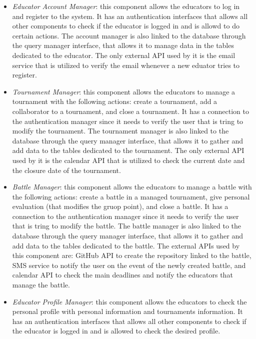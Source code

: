 \documentclass[12pt, a4paper]{report}
\begin{document}
    \begin{itemize}
        \item \textit{Educator Account Manager}: this component allows the educators to log in and register to the system.
            It has an authentication interfaces that allows all other components to check if the educator is logged in and is allowd to do certain actions. 
            The account manager is also linked to the database through the query manager interface, that allows it to manage data in the tables dedicated to the educator.
            The only external API used by it is the email service that is utilized to verify the email whenever a new eduator tries to register. 
        \item \textit{Tournament Manager}: this component allows the educators to manage a tournament with the following actions: create a tournament, add a collaborator to a tournament, and close a tournament. 
            It has a connection to the authentication manager since it needs to verify the user that is tring to modify the tournament. 
            The tournament manager is also linked to the database through the query manager interface, that allows it to gather and add data to the tables dedicated to the tournament.
            The only external API used by it is the calendar API that is utilized to check the current date and the closure date of the tournament.
        \item \textit{Battle Manager}: this component allows the educators to manage a battle with the following actions: create a battle in a managed tournament, give personal evaluation (that modifies the gruop point), and close a battle. 
            It has a connection to the authentication manager since it needs to verify the user that is tring to modify the battle. 
            The battle manager is also linked to the database through the query manager interface, that allows it to gather and add data to the tables dedicated to the battle.
            The external APIs used by this component are: GitHub API to create the repository linked to the battle, SMS service to notify the user on the event of the newly created battle, and calendar API to check the main deadlines and notify the educators that manage the battle.
        \item \textit{Educator Profile Manager}: this component allows the educators to check the personal profile with personal information and tournaments information. 
            It has an authentication interfaces that allows all other components to check if the educator is logged in and is allowed to check the desired profile. 

\end{itemize}
\end{document}
